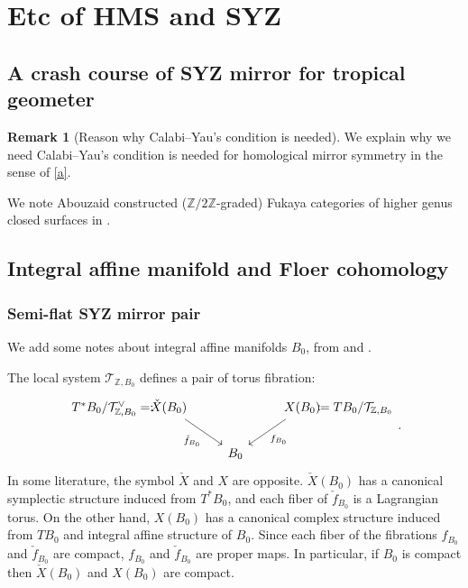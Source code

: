 \documentclass[a4paper,dvipdfmx,reqno,12pt]{amsart}
\theoremstyle{definition}
\newtheorem{remark}[theorem]{Remark}
\newcommand{\deq}{\coloneqq}
\newcommand{\Z}{\mathbb{Z}}%
\numberwithin{equation}{section}
\begin{document}
\section{Etc of HMS and SYZ}

\subsection{A crash course of SYZ mirror for tropical 
geometer}

\begin{remark}[{Reason why Calabi--Yau's condition is needed}]

We explain why we need Calabi--Yau's condition is needed for
homological mirror symmetry in the sense of \cref{a}.

We note Abouzaid constructed ($\Z/2\Z$-graded)
Fukaya categories of higher genus closed surfaces in
\cite{MR2383898}. 
\end{remark}





\subsection{Integral affine manifold and Floer cohomology}

\subsubsection{Semi-flat SYZ mirror pair}

We add some notes about integral affine manifolds $B_0$,
from \cite[Chapter 6]{MR2567952} and \cite{sepethesis}.

The local system $\mathcal{T}_{\mathbb{Z}, B_0}$ defines 
 a pair of torus fibration:
\begin{equation} \label{definition-SYZ-torus-fibration}
\begin{tikzcd}%
T^{*}B_0/\mathcal{T}_{\Z , B_0}^{\vee} =:\hspace{-35pt} 
&\check{X}(B_0) \arrow[rd,"\check{f}_{B_0}"'] 
&   & X(B_0) \arrow[ld,"f_{B_0}"] 
&\hspace{-35pt} \deq TB_0/\mathcal{T}_{\Z, B_0} \\
& &  B_0 & &
\end{tikzcd}.
\end{equation}
In some literature, the symbol $\check{X}$ and
$X$ are opposite. 
$\check{X}(B_0)$ has a canonical symplectic structure 
induced from $T^{*}B_0$, and each fiber of 
$\check{f}_{B_0}$ is a Lagrangian torus.
On the other hand, $X(B_0)$ has a canonical complex
structure induced from $TB_0$ and integral affine 
structure of $B_0$.
Since each fiber of the fibrations $f_{B_0}$ and 
$\check{f}_{B_0}$ are compact,
$f_{B_0}$ and $\check{f}_{B_0}$ are proper maps.
In particular, if $B_0$ is compact then 
$\check{X}(B_0)$ and $X(B_0)$ are compact.
\end{document}
